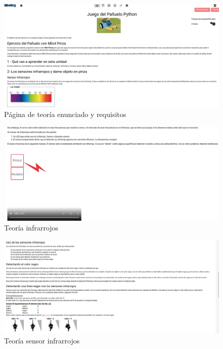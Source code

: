 \begin{figure}[H]
    \centering
    \includegraphics[width=1\textwidth, height=0.45\textwidth]{chapters/images/teoriag1.png}
    \caption{Página de teoría enunciado y requisitos}
    \label{fig:my_label}
\end{figure}
\begin{figure}[H]
    \centering
    \includegraphics[width=1\textwidth, height=0.4\textwidth]{chapters/images/teoriag2.png}
    \caption{Teoría infrarrojos}
    \label{fig:my_label}
\end{figure}
\begin{figure}[H]
    \centering
    \includegraphics[width=1\textwidth, height=0.4\textwidth]{chapters/images/teoriag3.png}
    \caption{Teoría sensor infrarrojos}
    \label{fig:my_label}
\end{figure}

